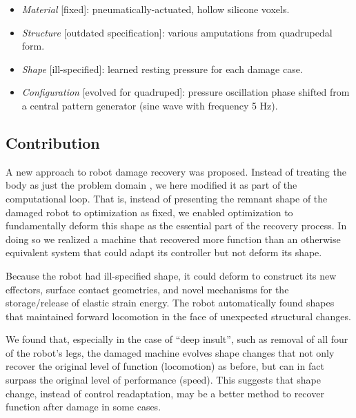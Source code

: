 \begin{itemize}
    \item \textit{Material} [fixed]: pneumatically-actuated, hollow silicone voxels.
    \item \textit{Structure} [outdated specification]: various amputations from quadrupedal form.
    \item \textit{Shape} [ill-specified]: learned resting pressure for each damage case.
    \item \textit{Configuration} [evolved for quadruped]: pressure oscillation phase shifted from a central pattern generator (sine wave with frequency 5 Hz).
\end{itemize}



\subsection{Contribution}



A new approach to robot damage recovery was proposed.
Instead of treating the body as just the problem domain \cite{bongard2006resilient,cully2015robots}, we here modified it as part of the computational loop.
That is, 
instead of presenting the remnant shape of the damaged robot to optimization as 
fixed, we enabled optimization to fundamentally deform this shape as the essential part of the recovery process.
In doing so we realized a machine that recovered more function than an otherwise equivalent system that could adapt its controller but not deform its shape.

Because the robot had ill-specified shape,
it could deform to construct its new effectors, surface contact geometries, and novel mechanisms for the storage/release of elastic strain energy.
The robot automatically found shapes that maintained forward locomotion in the face of unexpected structural changes.

We found that, especially in the case of ``deep insult'', such as removal of all four of the robot's legs, the damaged machine evolves shape changes that not only recover the original level of function (locomotion) as before, but can in fact surpass the original level of performance (speed).
This suggests that shape change, instead of control readaptation, may be a better method to recover function after damage in some cases.






